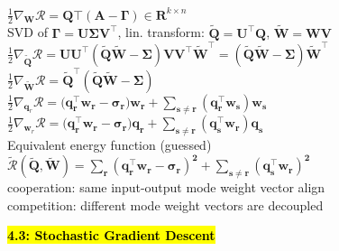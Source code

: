 \documentclass[10pt,landscape]{article}
\begin{document}
\begin{multicols*}{3}
{\begin{minipage}{\linewidth}
$\frac{1}{2}\nabla_\mathbf{W}\mathcal{R}=\mathbf{Q\top(A-\Gamma)}\in \mathbf{R}^{k\times n}$\\
SVD of $\mathbf{\Gamma=U\Sigma V^\top}$, lin. transform: $\mathbf{\tilde{Q}=U^\top Q}$, $\mathbf{\tilde{W}=WV}$
\\
$\frac{1}{2}\nabla_\mathbf{\tilde{Q}}\mathcal{R}=\mathbf{UU^\top(\tilde{Q}\tilde{W}-\Sigma)VV^\top\tilde{W}^\top = (\tilde{Q}\tilde{W}-\Sigma)\tilde{W}^\top}$\\
$\frac{1}{2}\nabla_\mathbf{\tilde{W}}\mathcal{R}=\mathbf{\tilde{Q}^\top(\tilde{Q}\tilde{W}-\Sigma)}$\\
$\frac{1}{2}\nabla_{\mathbf{q}_r}\mathcal{R}=(\mathbf{q_r^\top w_r-\sigma_r)w_r+\sum_{s\neq r}(q^\top_r w_s)w_s}$\\
$\frac{1}{2}\nabla_{\mathbf{w}_r}\mathcal{R}=(\mathbf{q_r^\top w_r-\sigma_r)q_r+\sum_{s\neq r}(q^\top_s w_r)q_s}$\\
Equivalent energy function (guessed)
\\ $\mathcal{\tilde{R}}(\mathbf{\tilde{Q}}, \mathbf{\tilde{W}})=\mathbf{\sum_r(q_r^\top w_r -\sigma_r)^2 + \sum_{s\neq r}(q^\top_s w_r)^2}$\\
cooperation: same input-output mode weight vector align \\
competition: different mode weight vectors are decoupled
\end{minipage}}
%
\hl{ \textbf{4.3: Stochastic Gradient Descent}}\\
\end{multicols*}
\end{document}
